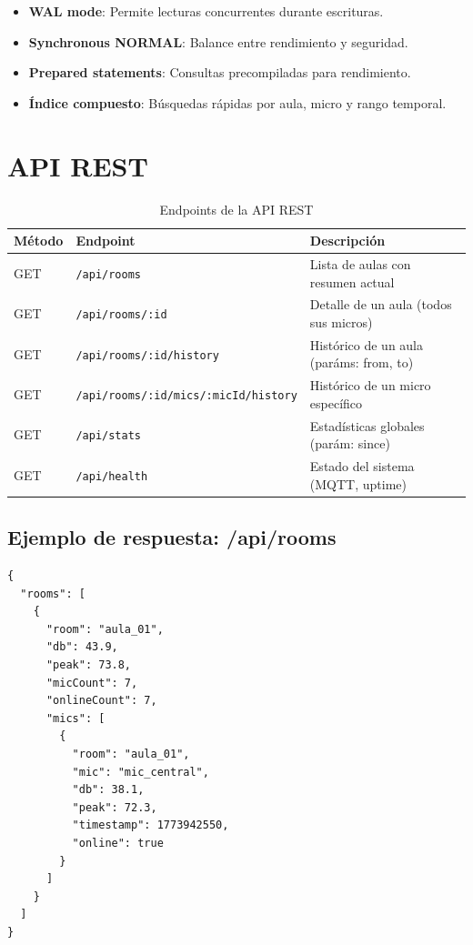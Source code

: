 \documentclass[12pt,a4paper]{report}
\begin{document}
\begin{itemize}
    \item \textbf{WAL mode}: Permite lecturas concurrentes durante escrituras.
    \item \textbf{Synchronous NORMAL}: Balance entre rendimiento y seguridad.
    \item \textbf{Prepared statements}: Consultas precompiladas para rendimiento.
    \item \textbf{\'Indice compuesto}: B\'usquedas r\'apidas por aula, micro y rango temporal.
\end{itemize}

\section{API REST}

\begin{table}[H]
\centering
\begin{tabularx}{\textwidth}{llX}
\toprule
\textbf{M\'etodo} & \textbf{Endpoint} & \textbf{Descripci\'on} \\
\midrule
GET & \texttt{/api/rooms} & Lista de aulas con resumen actual \\
GET & \texttt{/api/rooms/:id} & Detalle de un aula (todos sus micros) \\
GET & \texttt{/api/rooms/:id/history} & Hist\'orico de un aula (par\'ams: from, to) \\
GET & \texttt{/api/rooms/:id/mics/:micId/history} & Hist\'orico de un micro espec\'ifico \\
GET & \texttt{/api/stats} & Estad\'isticas globales (par\'am: since) \\
GET & \texttt{/api/health} & Estado del sistema (MQTT, uptime) \\
\bottomrule
\end{tabularx}
\caption{Endpoints de la API REST}
\end{table}

\subsection{Ejemplo de respuesta: /api/rooms}

\begin{lstlisting}[style=json, caption={Respuesta del endpoint /api/rooms}]
{
  "rooms": [
    {
      "room": "aula_01",
      "db": 43.9,
      "peak": 73.8,
      "micCount": 7,
      "onlineCount": 7,
      "mics": [
        {
          "room": "aula_01",
          "mic": "mic_central",
          "db": 38.1,
          "peak": 72.3,
          "timestamp": 1773942550,
          "online": true
        }
      ]
    }
  ]
}
\end{lstlisting}
\end{document}

